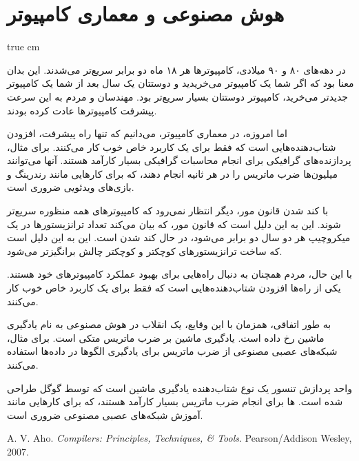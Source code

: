 \documentclass[11pt, twoside]{imsproc}
\let\LTRfootnote\footnoteA
\begin{document}
\section{هوش مصنوعی و معماری کامپیوتر}
 true cm

در دهه‌های ۸۰ و ۹۰ میلادی، کامپیوترها هر ۱۸ ماه دو برابر سریع‌تر می‌شدند. این بدان معنا بود که اگر شما یک کامپیوتر می‌خریدید و دوستتان یک سال بعد از شما یک کامپیوتر جدیدتر می‌خرید، کامپیوتر دوستتان بسیار سریع‌تر بود. مهندسان و مردم به این سرعت پیشرفت کامپیوترها عادت کرده بودند.

اما امروزه، در معماری کامپیوتر، می‌دانیم که تنها راه پیشرفت، افزودن شتاب‌دهنده‌هایی است که فقط برای یک کاربرد خاص خوب کار می‌کنند. برای مثال، پردازنده‌های گرافیکی\LTRfootnote{\lr{GPU}} برای انجام محاسبات گرافیکی بسیار کارآمد هستند. آنها می‌توانند میلیون‌ها ضرب ماتریس را در هر ثانیه انجام دهند، که برای کارهایی مانند رندرینگ  و بازی‌های ویدئویی ضروری است.

با کند شدن قانون مور، دیگر انتظار نمی‌رود که کامپیوترهای همه منظوره سریع‌تر شوند. این به این دلیل است که قانون مور، که بیان می‌کند تعداد ترانزیستورها در یک میکروچیپ هر دو سال دو برابر می‌شود، در حال کند شدن است. این به این دلیل است که ساخت ترانزیستورهای کوچکتر و کوچکتر چالش برانگیزتر می‌شود.

با این حال، مردم همچنان به دنبال راه‌هایی برای بهبود عملکرد کامپیوترهای خود هستند. یکی از راه‌ها افزودن شتاب‌دهنده‌هایی است که فقط برای یک کاربرد خاص خوب کار می‌کنند.

به طور اتفاقی، همزمان با این وقایع، یک انقلاب در هوش مصنوعی به نام یادگیری ماشین رخ داده است. یادگیری ماشین بر ضرب ماتریس متکی است. برای مثال، شبکه‌های عصبی مصنوعی  از ضرب ماتریس برای یادگیری الگوها در داده‌ها استفاده می‌کنند.

واحد پردازش تنسور  یک نوع شتاب‌دهنده یادگیری ماشین است که توسط گوگل طراحی شده است. ها برای انجام ضرب ماتریس بسیار کارآمد هستند، که برای کارهایی مانند آموزش شبکه‌های عصبی مصنوعی  ضروری است.

\begin{thebibliography}{99}%
\begin{LTRbibitems}
\resetlatinfont

A. V. Aho. \emph{Compilers: Principles, Techniques, \& Tools}. Pearson/Addison Wesley, 2007.
\end{LTRbibitems}
\end{thebibliography}

\end{document}
